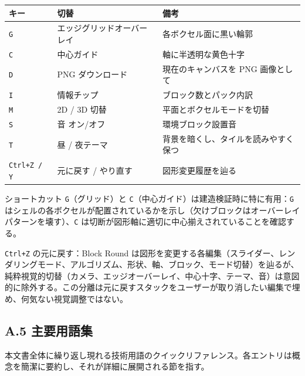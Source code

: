 \documentclass[12pt,a4paper]{scrartcl}
\newcommand{\code}[1]{\texttt{\small #1}}
\begin{document}
\vspace{0.4em}
\begin{center}
\begin{tabular}{@{}lll@{}}
\toprule
\textbf{キー} & \textbf{切替} & \textbf{備考} \\
\midrule
\code{G} & エッジグリッドオーバーレイ  & 各ボクセル面に黒い輪郭 \\
\code{C} & 中心ガイド  & 軸に半透明な黄色十字 \\
\code{D} & PNG ダウンロード  & 現在のキャンバスを PNG 画像として \\
\code{I} & 情報チップ  & ブロック数とパック内訳 \\
\code{M} & 2D / 3D 切替  & 平面とボクセルモードを切替 \\
\code{S} & 音 オン/オフ  & 環境ブロック設置音 \\
\code{T} & 昼 / 夜テーマ  & 背景を暗くし、タイルを読みやすく保つ \\
\code{Ctrl+Z / Y} & 元に戻す / やり直す  & 図形変更履歴を辿る \\
\bottomrule
\end{tabular}
\end{center}

ショートカット \code{G}（グリッド）と \code{C}（中心ガイド）は建造検証時に特に有用：\code{G} はシェルの各ボクセルが配置されているかを示し（欠けブロックはオーバーレイパターンを壊す）、\code{C} は切断が図形軸に適切に中心揃えされていることを確認する。

\code{Ctrl+Z} の元に戻す：Block Round は図形を変更する各編集（スライダー、レンダリングモード、アルゴリズム、形状、軸、ブロック、モード切替）を辿るが、純粋視覚的切替（カメラ、エッジオーバーレイ、中心十字、テーマ、音）は意図的に除外する。この分離は元に戻すスタックをユーザーが取り消したい編集で埋め、何気ない視覚調整ではない。

\subsection*{A.5 主要用語集}

本文書全体に繰り返し現れる技術用語のクイックリファレンス。各エントリは概念を簡潔に要約し、それが詳細に展開される節を指す。
\end{document}

